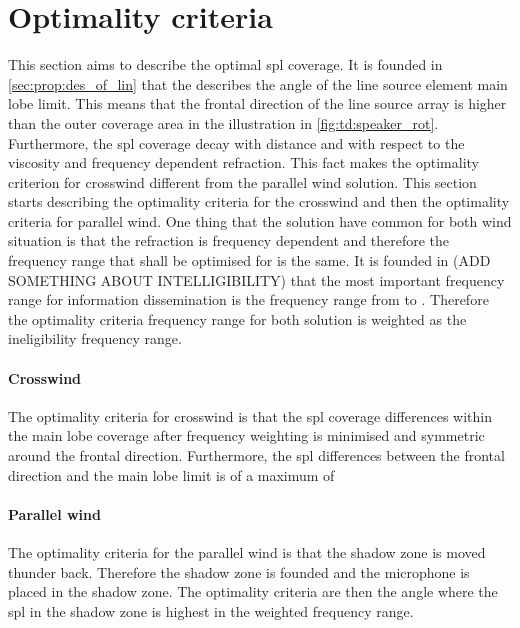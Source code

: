 \section{Optimality criteria}
This section aims to describe the optimal \gls{spl} coverage. It is founded in \autoref{sec:prop:des_of_lin} that the  describes the angle of the line source element main lobe limit. This means that the frontal direction of the line source array is  higher than the outer coverage area in the illustration in \autoref{fig:td:speaker_rot}. Furthermore, the \gls{spl} coverage decay with distance and with respect to the viscosity and frequency dependent refraction. This fact makes the optimality criterion for crosswind different from the parallel wind solution. This section starts describing the optimality criteria for the crosswind and then the optimality criteria for parallel wind. One thing that the solution have common for both wind situation is that the refraction is frequency dependent and therefore the frequency range that shall be optimised for is the same. It is founded in (ADD SOMETHING ABOUT INTELLIGIBILITY) that the most important frequency range for information dissemination is the frequency range from  to . Therefore the optimality criteria frequency range for both solution is weighted as the ineligibility frequency range. 


\paragraph{Crosswind} The optimality criteria for crosswind is that the \gls{spl} coverage differences within the main lobe coverage after frequency weighting is minimised and symmetric around the frontal direction. Furthermore, the \gls{spl} differences between the frontal direction and the main lobe limit is of a maximum of 





\paragraph{Parallel wind} The optimality criteria for the parallel wind is that the shadow zone is moved thunder back. Therefore the shadow zone is founded and the microphone is placed in the shadow zone. The optimality criteria are then the angle where the \gls{spl} in the shadow zone is highest in the weighted frequency range. 
